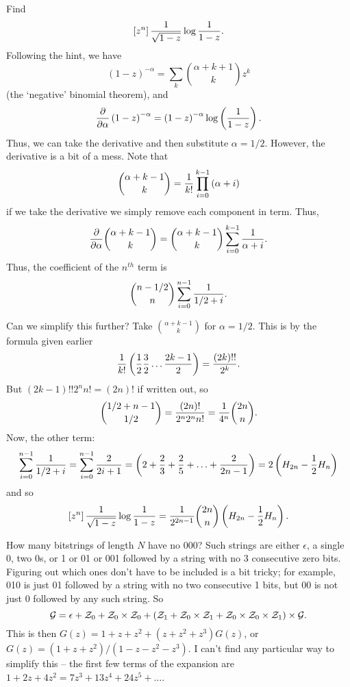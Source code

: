 \vskip 0.08in  Find
$$
 \left[z^n\right] {1 \over \sqrt{1 - z}} \log {1 \over 1 - z}.
$$
Following the hint, we
have
$$
 \left(1 - z\right)^{-\alpha} = \sum_k {\alpha + k + 1 \choose k} z^k
$$
(the `negative' binomial theorem), and
$$
 {\partial \over \partial \alpha} \left(1 - z \right)^{-\alpha}
  = \left(1 - z\right)^{-\alpha} \log \left({1 \over 1 - z}\right).
$$
Thus, we can take the derivative and then substitute $\alpha = 1/2$.
However, the derivative is a bit of a mess.  Note that
$$
  {\alpha + k - 1 \choose k} = {1 \over k!} \prod_{i=0}^{k-1} \left(\alpha + i\right)
$$
if we take the derivative we simply remove each component in term.  Thus,
$$
 {\partial \over \partial \alpha} {\alpha + k - 1 \choose k} =
  {\alpha + k - 1 \choose k} \sum_{i=0}^{k-1} {1 \over \alpha + i}.
$$
Thus, the coefficient of the $n^{th}$ term is
$$
 {n - 1/2 \choose n} \sum_{i=0}^{n-1} {1 \over 1/2 + i}.
$$

Can we simplify this further?  Take $\alpha + k - 1 \choose k$ for $\alpha = 1/2$.
This is by the formula given earlier 
$$
 {1 \over k!} \left({1 \over 2} {3 \over 2} \ldots {2k - 1 \over 2}\right) =
  {\left(2k\right)!! \over 2^k}.
$$
But $\left(2k - 1\right)!! 2^n n! = \left(2 n\right)!$ if written out,
so
$$
 {1/2 + n - 1 \choose 1/2} = {\left(2 n\right)! \over 2^n 2^n n!} = {1 \over 4^n} {2n \choose n}.
$$
Now, the other term:
$$
 \sum_{i=0}^{n-1} {1 \over 1/2 + i} = \sum_{i=0}^{n-1} {2 \over 2 i + 1}
  = \left(2 + {2 \over 3} + {2 \over 5} + \ldots + {2 \over 2 n - 1}\right)
  = 2 \left(H_{2n} - {1 \over 2} H_n\right)
$$
and so
$$
 \left[z^n\right] {1 \over \sqrt{1 - z}} \log {1 \over 1 - z} =
  {1 \over 2^{2n-1}} {2n \choose n} \left(H_{2n} - {1 \over 2} H_n\right).
$$

\vskip 0.08in  How many bitstrings of
length $N$ have no 000?\hfil\break
Such strings are either $\epsilon$, a single 0, two 0s, or 1 or 01 or 001 followed
by a string with no 3 consecutive zero bits.  Figuring out which ones
don't have to be included is a bit tricky; for example, 010 is just 01 followed
by a string with no two consecutive 1 bits, but 00 is not just 0 followed
by any such string.  So
$$
 {\cal G} = \epsilon + {\cal Z}_0 + {\cal Z}_0 \times {\cal Z}_0
   + \left({\cal Z}_1 + {\cal Z}_0 \times {\cal Z}_1 
   + {\cal Z}_0 \times {\cal Z}_0 \times {\cal Z}_1\right) \times {\cal G}.
$$
This is then $G\left(z\right) = 1 + z + z^2 + \left(z + z^2 + z^3\right) G\left(z\right)$,
or $G\left(z\right) = \left(1 + z + z^2\right) / \left(1 - z - z^2 - z^3\right)$.  I can't
find any particular way to simplify this -- the first few terms of the expansion
are $1 + 2z + 4z^2 = 7z^3 + 13z^4 + 24z^5 + \ldots$.

